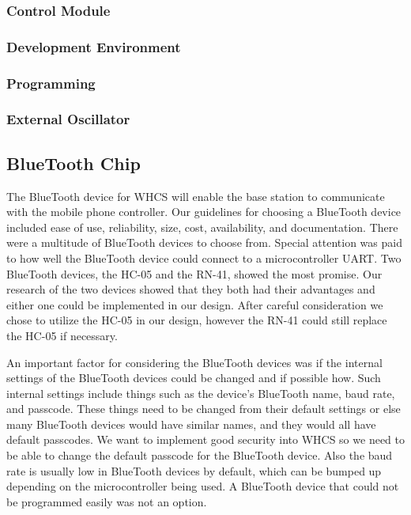 \subsubsection{Control Module}

\subsubsection{Development Environment}

\subsubsection{Programming}

\subsubsection{External Oscillator}

\subsection{BlueTooth Chip}
The BlueTooth device for WHCS will enable the base station to communicate with
the mobile phone controller. Our guidelines for choosing a BlueTooth device
included ease of use, reliability, size, cost, availability, and documentation.
There were a multitude of BlueTooth devices to choose from. Special attention
was paid to how well the BlueTooth device could connect to a microcontroller
UART. Two BlueTooth devices, the HC{}-05 and the RN{}-41, showed the most
promise. Our research of the two devices showed that they both had their
advantages and either one could be implemented in our design. After careful
consideration we chose to utilize the HC{}-05 in our design, however the
RN{}-41 could still replace the HC{}-05 if necessary.

An important factor for considering the BlueTooth devices was if the internal
settings of the BlueTooth devices could be changed and if possible how. Such
internal settings include things such as the device{}'s BlueTooth name, baud
rate, and passcode. These things need to be changed from their default settings
or else many BlueTooth devices would have similar names, and they would all
have default passcodes. We want to implement good security into WHCS so we need
to be able to change the default passcode for the BlueTooth device. Also the
baud rate is usually low in BlueTooth devices by default, which can be bumped
up depending on the microcontroller being used. A BlueTooth device that could
not be programmed easily was not an option.

